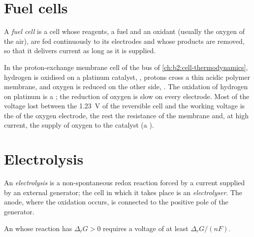 \section{Fuel cells}

\begin{definition}\label{def:b2:batteries-electrolysis:fuel-cell}
A \emph{fuel cell} is a cell whose reagents, a fuel and an
oxidant (usually the oxygen of the air), are fed continuously to its
electrodes and whose products are removed, so that it delivers current as long
as it is supplied.
\end{definition}

In the proton-exchange membrane cell of the bus of
\cref{ch:b2:cell-thermodynamics}, hydrogen is oxidised on a platinum catalyst,
, protons cross a thin acidic polymer membrane, and oxygen is
reduced on the other side, . The oxidation of hydrogen
on platinum is a ; the reduction of oxygen is slow on every
electrode. Most of the voltage lost between the \qty{1.23}{V} of the reversible
cell and the working voltage is the  of the oxygen electrode,
the rest the resistance of the membrane and, at high current, the supply of
oxygen to the catalyst (a ).

\section{Electrolysis}

\begin{definition}[Electrolysis]\label{def:b2:batteries-electrolysis:electrolysis}
An \emph{electrolysis} is a non-spontaneous redox reaction
forced by a current supplied by an external generator; the cell in which it
takes place is an \emph{electrolyser}. The anode, where the
oxidation occurs, is connected to the positive pole of the generator.
\end{definition}

\begin{proposition}\label{prop:b2:batteries-electrolysis:minimum-voltage}
An  whose reaction has $\Delta_r G > 0$ requires a voltage of at
least $\Delta_r G/(nF)$.
\end{proposition}

